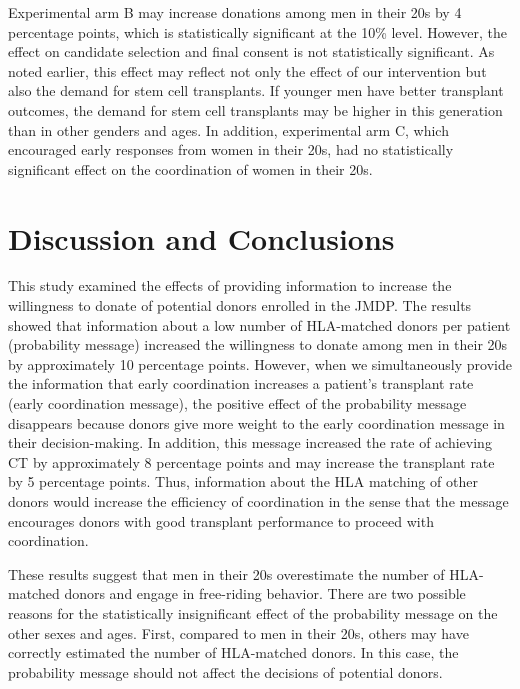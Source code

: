 \documentclass[12pt, a4paper]{article}
\begin{document}
Experimental arm B may increase donations among men in their 20s by 4 percentage points, which is statistically significant at the 10\% level. However, the effect on candidate selection and final consent is not statistically significant. As noted earlier, this effect may reflect not only the effect of our intervention but also the demand for stem cell transplants. If younger men have better transplant outcomes, the demand for stem cell transplants may be higher in this generation than in other genders and ages. In addition, experimental arm C, which encouraged early responses from women in their 20s, had no statistically significant effect on the coordination of women in their 20s.

\hypertarget{conclusion}{%
\section{Discussion and Conclusions}\label{conclusion}}

This study examined the effects of providing information to increase the willingness to donate of potential donors enrolled in the JMDP. The results showed that information about a low number of HLA-matched donors per patient (probability message) increased the willingness to donate among men in their 20s by approximately 10 percentage points. However, when we simultaneously provide the information that early coordination increases a patient's transplant rate (early coordination message), the positive effect of the probability message disappears because donors give more weight to the early coordination message in their decision-making. In addition, this message increased the rate of achieving CT by approximately 8 percentage points and may increase the transplant rate by 5 percentage points. Thus, information about the HLA matching of other donors would increase the efficiency of coordination in the sense that the message encourages donors with good transplant performance to proceed with coordination.

These results suggest that men in their 20s overestimate the number of HLA-matched donors and engage in free-riding behavior. There are two possible reasons for the statistically insignificant effect of the probability message on the other sexes and ages. First, compared to men in their 20s, others may have correctly estimated the number of HLA-matched donors. In this case, the probability message should not affect the decisions of potential donors.
\end{document}
